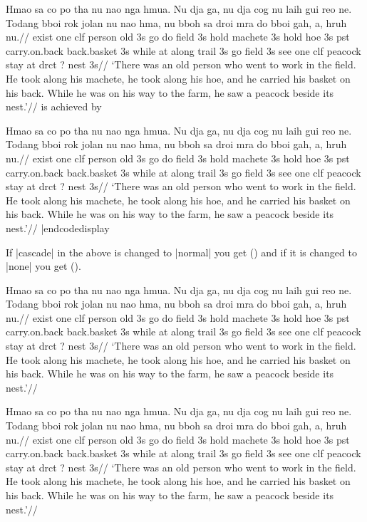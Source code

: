 \framedisplay
\ex[glhangstyle=cascade]
\begingl
\gla
Hmao sa co po tha  nu nao nga hmua. Nu dja ga, nu dja cog nu laih
gui reo ne. Todang bboi rok jolan nu nao hma, nu bboh sa droi mra
do bboi gah, a, hruh nu.//
\glb
exist one {clf} person old 3s go do field 3s hold machete 3s hold
hoe 3s pst carry.on.back back.basket 3s while at {along} trail 3s
go field 3s see one clf peacock stay at drct {?} nest 3s//
\glft
`There was an old person who went to work in the field. He took
along his machete, he took along his hoe, and he carried his
basket on his back. While he was on his way to the farm, he saw a
peacock beside its nest.'//
\endgl
\xe
\endframedisplay
is achieved by

\codedisplay
\ex[glhangstyle=cascade]
\begingl
\gla
Hmao sa co po tha  nu nao nga hmua. Nu dja ga, nu dja cog nu laih
gui reo ne. Todang bboi rok jolan nu nao hma, nu bboh sa droi mra
do bboi gah, a, hruh nu.//
\glb
exist one {clf} person old 3s go do field 3s hold machete 3s hold
hoe 3s pst carry.on.back back.basket 3s while at {along} trail 3s
go field 3s see one clf peacock stay at drct {?} nest 3s//
\glft
`There was an old person who went to work in the field. He took
along his machete, he took along his hoe, and he carried his
basket on his back. While he was on his way to the farm, he saw a
peacock beside its nest.'//
\endgl
\xe
|endcodedisplay

If |cascade| in the above is changed to |normal| you get (\nextx)
and if it is changed to |none| you get (\anextx).

\framedisplay
\ex[glhangstyle=normal]
\begingl
\gla
Hmao sa co po tha  nu nao nga hmua. Nu dja ga, nu dja cog nu laih
gui reo ne. Todang bboi rok jolan nu nao hma, nu bboh sa droi mra
do bboi gah, a, hruh nu.//
\glb
exist one {clf} person old 3s go do field 3s hold machete 3s hold
hoe 3s pst carry.on.back back.basket 3s while at {along} trail 3s
go field 3s see one clf peacock stay at drct {?} nest 3s//
\glft
`There was an old person who went to work in the field. He took
along his machete, he took along his hoe, and he carried his
basket on his back. While he was on his way to the farm, he saw a
peacock beside its nest.'//
\endgl
\xe
\endframedisplay

\framedisplay
\ex[glhangstyle=none]
\begingl
\gla
Hmao sa co po tha  nu nao nga hmua. Nu dja ga, nu dja cog nu laih
gui reo ne. Todang bboi rok jolan nu nao hma, nu bboh sa droi mra
do bboi gah, a, hruh nu.//
\glb
exist one {clf} person old 3s go do field 3s hold machete 3s hold
hoe 3s pst carry.on.back back.basket 3s while at {along} trail 3s
go field 3s see one clf peacock stay at drct {?} nest 3s//
\glft
`There was an old person who went to work in the field. He took
along his machete, he took along his hoe, and he carried his
basket on his back. While he was on his way to the farm, he saw a
peacock beside its nest.'//
\endgl
\xe
\endframedisplay



